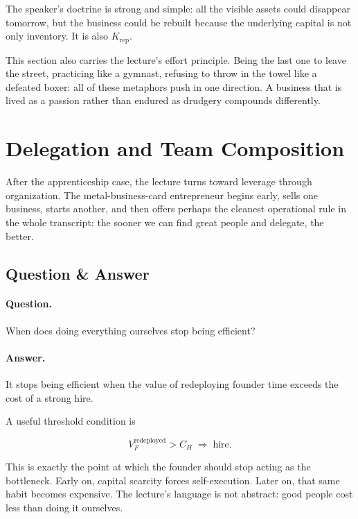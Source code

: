 The speaker's doctrine is strong and simple: all the visible assets could disappear tomorrow, but the business could be rebuilt because the underlying capital is not only inventory. It is also \(K_{\mathrm{rep}}\).

This section also carries the lecture's effort principle. Being the last one to leave the street, practicing like a gymnast, refusing to throw in the towel like a defeated boxer: all of these metaphors push in one direction. A business that is lived as a passion rather than endured as drudgery compounds differently.

\section{Delegation and Team Composition}

After the apprenticeship case, the lecture turns toward leverage through organization. The metal-business-card entrepreneur begins early, sells one business, starts another, and then offers perhaps the cleanest operational rule in the whole transcript: the sooner we can find great people and delegate, the better.

\subsection{Question \& Answer}

\paragraph{Question.} When does doing everything ourselves stop being efficient?

\paragraph{Answer.} It stops being efficient when the value of redeploying founder time exceeds the cost of a strong hire.

A useful threshold condition is

\begin{equation}
V_F^{\mathrm{redeployed}} > C_H \;\Rightarrow\; \mbox{hire}.
\end{equation}

This is exactly the point at which the founder should stop acting as the bottleneck. Early on, capital scarcity forces self-execution. Later on, that same habit becomes expensive. The lecture's language is not abstract: good people cost less than doing it ourselves.

